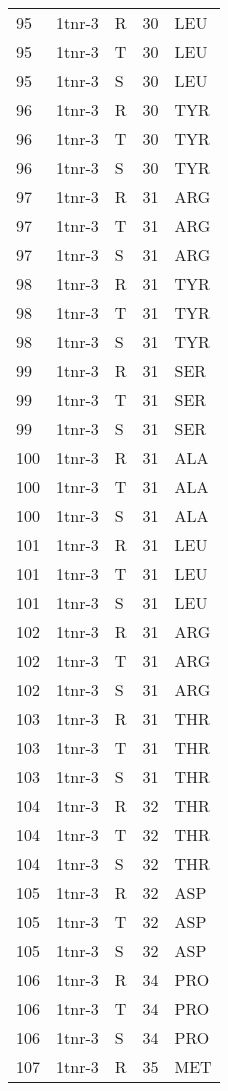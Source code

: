 \begin{longtable}[l]{l|l|l|l|l}
	95 & 1tnr-3 & R & 30 & LEU \\
	95 & 1tnr-3 & T & 30 & LEU \\
	95 & 1tnr-3 & S & 30 & LEU \\
	96 & 1tnr-3 & R & 30 & TYR \\
	96 & 1tnr-3 & T & 30 & TYR \\
	96 & 1tnr-3 & S & 30 & TYR \\
	97 & 1tnr-3 & R & 31 & ARG \\
	97 & 1tnr-3 & T & 31 & ARG \\
	97 & 1tnr-3 & S & 31 & ARG \\
	98 & 1tnr-3 & R & 31 & TYR \\
	98 & 1tnr-3 & T & 31 & TYR \\
	98 & 1tnr-3 & S & 31 & TYR \\
	99 & 1tnr-3 & R & 31 & SER \\
	99 & 1tnr-3 & T & 31 & SER \\
	99 & 1tnr-3 & S & 31 & SER \\
	100 & 1tnr-3 & R & 31 & ALA \\
	100 & 1tnr-3 & T & 31 & ALA \\
	100 & 1tnr-3 & S & 31 & ALA \\
	101 & 1tnr-3 & R & 31 & LEU \\
	101 & 1tnr-3 & T & 31 & LEU \\
	101 & 1tnr-3 & S & 31 & LEU \\
	102 & 1tnr-3 & R & 31 & ARG \\
	102 & 1tnr-3 & T & 31 & ARG \\
	102 & 1tnr-3 & S & 31 & ARG \\
	103 & 1tnr-3 & R & 31 & THR \\
	103 & 1tnr-3 & T & 31 & THR \\
	103 & 1tnr-3 & S & 31 & THR \\
	104 & 1tnr-3 & R & 32 & THR \\
	104 & 1tnr-3 & T & 32 & THR \\
	104 & 1tnr-3 & S & 32 & THR \\
	105 & 1tnr-3 & R & 32 & ASP \\
	105 & 1tnr-3 & T & 32 & ASP \\
	105 & 1tnr-3 & S & 32 & ASP \\
	106 & 1tnr-3 & R & 34 & PRO \\
	106 & 1tnr-3 & T & 34 & PRO \\
	106 & 1tnr-3 & S & 34 & PRO \\
	107 & 1tnr-3 & R & 35 & MET \\

\end{longtable}
